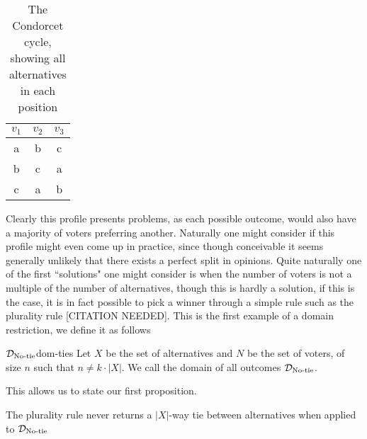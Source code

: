 

\begin{table}[h]
	\centering
	\begin{tabular}{ccc}
		\toprule
		$v_1$ & $v_2$ & $v_3$ \\
		\midrule
		a     & b     & c     \\
		b     & c     & a     \\
		c     & a     & b     \\
		\bottomrule
	\end{tabular}
	\caption{The Condorcet cycle, showing all alternatives in each position}
	\label{tab: Condorcet}
\end{table}

Clearly this profile presents problems, as each possible outcome, would also have a majority of voters preferring another. Naturally one might consider if this profile might even come up in practice, since though conceivable it seems generally unlikely that there exists a perfect split in opinions. Quite naturally one of the first ``solutions" one might consider is when the number of voters is not a multiple of the number of alternatives, though this is hardly a solution, if this is the case, it is in fact possible to pick a winner through a simple rule such as the plurality rule [CITATION NEEDED]. This is the first example of a domain restriction, we define it as follows

\begin{definition}{$\mathcal{D}_{\textnormal{No-tie}}$}{dom-ties}
	Let $X$ be the set of alternatives and $N$ be the set of voters, of size $n$ such that $n \neq k \cdot |X|$. We call the domain of all outcomes $\mathcal{D}_{\textnormal{No-tie}}$.
\end{definition}

This allows us to state our first proposition.

\begin{proposition}
	The plurality rule never returns a $|X|$-way tie between alternatives when applied to $\mathcal{D}_{\textnormal{No-tie}}$
\end{proposition}

